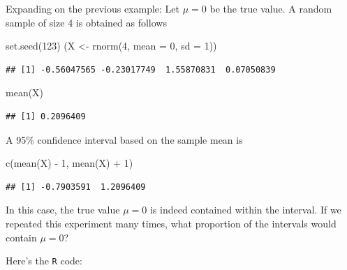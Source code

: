 \documentclass[
]{book}
\newenvironment{Shaded}{\begin{snugshade}}{\end{snugshade}}
\newcommand{\AttributeTok}[1]{\textcolor[rgb]{0.77,0.63,0.00}{#1}}
\newcommand{\DecValTok}[1]{\textcolor[rgb]{0.00,0.00,0.81}{#1}}
\newcommand{\FunctionTok}[1]{\textcolor[rgb]{0.00,0.00,0.00}{#1}}
\newcommand{\NormalTok}[1]{#1}
\newcommand{\OtherTok}[1]{\textcolor[rgb]{0.56,0.35,0.01}{#1}}
\newcommand{\SpecialCharTok}[1]{\textcolor[rgb]{0.00,0.00,0.00}{#1}}
\theoremstyle{definition}
\theoremstyle{definition}
\theoremstyle{definition}
\theoremstyle{definition}
\theoremstyle{remark}
\begin{document}
Expanding on the previous example: Let \(\mu=0\) be the true value.
A random sample of size 4 is obtained as follows

\begin{Shaded}
\begin{Highlighting}[]
\FunctionTok{set.seed}\NormalTok{(}\DecValTok{123}\NormalTok{)}
\NormalTok{(X }\OtherTok{\textless{}{-}} \FunctionTok{rnorm}\NormalTok{(}\DecValTok{4}\NormalTok{, }\AttributeTok{mean =} \DecValTok{0}\NormalTok{, }\AttributeTok{sd =} \DecValTok{1}\NormalTok{))}
\end{Highlighting}
\end{Shaded}

\begin{verbatim}
## [1] -0.56047565 -0.23017749  1.55870831  0.07050839
\end{verbatim}

\begin{Shaded}
\begin{Highlighting}[]
\FunctionTok{mean}\NormalTok{(X)}
\end{Highlighting}
\end{Shaded}

\begin{verbatim}
## [1] 0.2096409
\end{verbatim}

A 95\% confidence interval based on the sample mean is

\begin{Shaded}
\begin{Highlighting}[]
\FunctionTok{c}\NormalTok{(}\FunctionTok{mean}\NormalTok{(X) }\SpecialCharTok{{-}} \DecValTok{1}\NormalTok{, }\FunctionTok{mean}\NormalTok{(X) }\SpecialCharTok{+} \DecValTok{1}\NormalTok{)}
\end{Highlighting}
\end{Shaded}

\begin{verbatim}
## [1] -0.7903591  1.2096409
\end{verbatim}

In this case, the true value \(\mu=0\) is indeed contained within the interval.
If we repeated this experiment many times, what proportion of the intervals would contain \(\mu=0\)?

Here's the \texttt{R} code:
\end{document}
